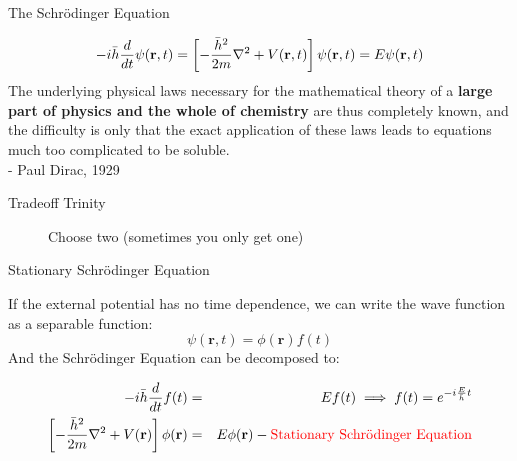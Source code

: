 \documentclass[aspectratio=169]{beamer}
\let \vec \mathbf
\begin{document}
    \begin{frame}{The Schr\"odinger Equation}

        \begin{equation}
            \large
            -i\bar{h}\frac{d}{dt}\psi(\vec{r},t)=\left[-\frac{\bar{h}^2}{2m}\nabla^2 + V(\vec{r},t)\right]\psi(\vec{r}, t) = E\psi(\vec{r},t)
        \end{equation}
        The underlying physical laws necessary for the mathematical theory of a \textbf{large part of physics and the whole of chemistry} are thus completely known, and the difficulty is only that the exact application of these laws leads to equations much too complicated to be soluble.\\
        - Paul Dirac, 1929

    \end{frame}


    \begin{frame}{Tradeoff Trinity}
        \begin{figure}
            \centering
            \caption{Choose two (sometimes you only get one)}
        \end{figure}

    \end{frame}


    \begin{frame}{Stationary Schr\"odinger Equation}

        If the external potential has no time dependence, we can write the wave function as a separable function:
        \begin{equation*}
            \psi(\vec{r},t)=\phi(\vec{r})f(t)
        \end{equation*}
        And the Schrödinger Equation can be decomposed to:

        \begin{eqnarray*}
            -i\bar{h}\frac{d}{dt}f(t) & = & Ef(t) \implies f(t) = e^{-i\frac{E}{\bar{h}}t}\\
            \left[-\frac{\bar{h}^2}{2m}\nabla^2 + V(\vec{r})\right]\phi(\vec{r}) & = & E\phi(\vec{r}) - \mbox{\textcolor{red}{Stationary Schr\"odinger Equation}}
        \end{eqnarray*}

    \end{frame}
\end{document}
